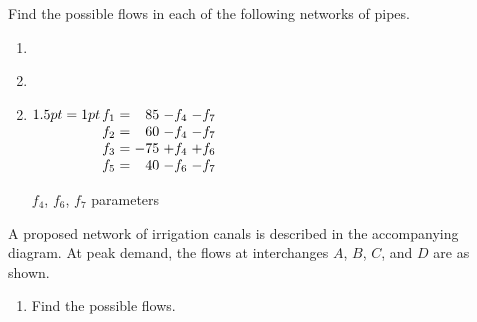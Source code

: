 \begin{multicols}{2}

\begin{ex}\label{ex:pipenetwork}
Find the possible flows in each of the following networks of pipes.
\begin{enumerate}[label={\alph*.}]
\item \hfill
\begin{figure}[H]
\centering

\end{figure}

\item \hfill
\begin{figure}[H]
\centering

\end{figure}
\end{enumerate}
\begin{sol}
\begin{enumerate}[label={\alph*.}]
\setcounter{enumi}{1}
\item  
$\arraycolsep=1pt
\begin{array}[t]{rcrrr}
	f_1 & = &  85 & - f_4 & - f_7 \\
	f_2 & = &  60 & - f_4 & - f_7 \\
	f_3 & = & -75 & + f_4 & + f_6 \\
	f_5 & = &  40 & - f_6 & - f_7 \\
\end{array}$

$f_4$, $f_6$, $f_7$ parameters

\end{enumerate}
\end{sol}
\end{ex}

\begin{ex}
A proposed network of irrigation canals is described in the accompanying diagram. At peak demand, the flows at interchanges $A$, $B$, $C$, and $D$ are as shown.

\begin{figure}[H]
\centering

\end{figure}

\begin{enumerate}[label={\alph*.}]
\item Find the possible flows.


\end{enumerate}
\end{ex}
\end{multicols}
